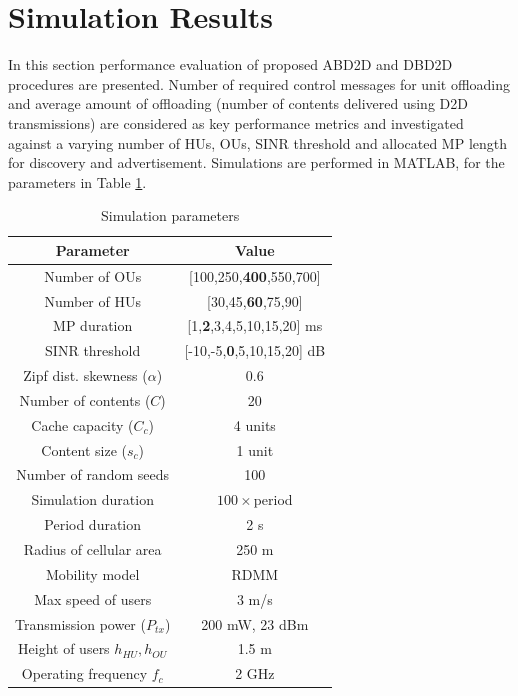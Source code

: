 \documentclass[10pt,a4paper,twocolumn]{article}
\begin{document}
\section{Simulation Results}
\label{sec:sec6}

In this section performance evaluation of proposed ABD2D and DBD2D procedures are presented. Number of required control messages for unit offloading and average amount of offloading (number of contents delivered using D2D transmissions) are considered as key performance metrics and investigated against a varying number of HUs, OUs, SINR threshold and allocated MP length for discovery and advertisement. Simulations are performed in MATLAB, for the parameters in Table \ref{table:simparameters}.

\begin{table}[!htb]
	\centering
	\caption{Simulation parameters}\label{table:simparameters}
	\begin{tabular}{|c|c|}
		\hline
		\textbf{Parameter} & \textbf{Value} \\\hline
		Number of OUs & [100,250,\textbf{400},550,700] \\\hline
		Number of HUs & [30,45,\textbf{60},75,90] \\\hline
		MP duration  & [1,\textbf{2},3,4,5,10,15,20] ms \\\hline
		SINR threshold & [-10,-5,\textbf{0},5,10,15,20] dB \\\hline
		Zipf dist. skewness ($\alpha$)  &  0.6 \\\hline
		Number of contents ($C$) & 20 \\\hline
		Cache capacity ($C_c$) & 4 units \\\hline
		Content size ($s_c$) & 1 unit \\\hline
		Number of random seeds & 100 \\\hline
		Simulation duration & $100\times$period \\\hline
		Period duration & 2 s \\\hline
		Radius of cellular area & 250 m \\\hline
		Mobility model  & RDMM \\\hline
		Max speed of users  & 3 m/s \\\hline
		Transmission power ($P_{tx}$) & 200 mW, 23 dBm \\\hline
		Height of users $h_{HU},h_{OU}$ & 1.5 m \\\hline
		Operating frequency $f_{c}$ & 2 GHz \\\hline
	\end{tabular}
\end{table}
\end{document}
